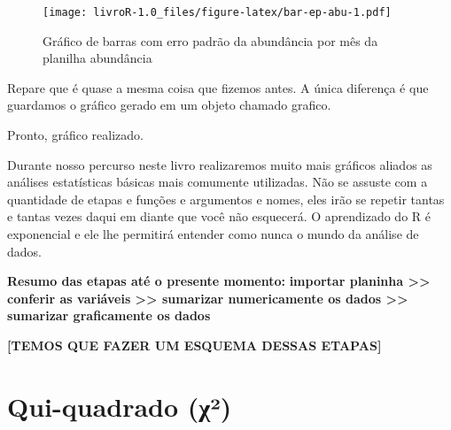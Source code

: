 \documentclass[]{book}
\newenvironment{Shaded}{\begin{snugshade}}{\end{snugshade}}
\newcommand{\DataTypeTok}[1]{\textcolor[rgb]{0.13,0.29,0.53}{#1}}
\newcommand{\DecValTok}[1]{\textcolor[rgb]{0.00,0.00,0.81}{#1}}
\newcommand{\KeywordTok}[1]{\textcolor[rgb]{0.13,0.29,0.53}{\textbf{#1}}}
\newcommand{\NormalTok}[1]{#1}
\newcommand{\OperatorTok}[1]{\textcolor[rgb]{0.81,0.36,0.00}{\textbf{#1}}}
\newcommand{\StringTok}[1]{\textcolor[rgb]{0.31,0.60,0.02}{#1}}
\begin{document}
\begin{Shaded}
\end{Shaded}

\begin{figure}
\centering
\texttt{[image: livroR-1.0\_files/figure-latex/bar-ep-abu-1.pdf]}
\caption{\label{fig:bar-ep-abu}Gráfico de barras com erro padrão da abundância por mês da planilha abundância}
\end{figure}

Repare que é quase a mesma coisa que fizemos antes. A única diferença é que guardamos o gráfico gerado em um objeto chamado grafico.

Pronto, gráfico realizado.

Durante nosso percurso neste livro realizaremos muito mais gráficos aliados as análises estatísticas básicas mais comumente utilizadas. Não se assuste com a quantidade de etapas e funções e argumentos e nomes, eles irão se repetir tantas e tantas vezes daqui em diante que você não esquecerá. O aprendizado do R é exponencial e ele lhe permitirá entender como nunca o mundo da análise de dados.

\textbf{Resumo das etapas até o presente momento:}
\textbf{importar planinha \textgreater{}\textgreater{} conferir as variáveis \textgreater{}\textgreater{} sumarizar numericamente os dados \textgreater{}\textgreater{} sumarizar graficamente os dados}

\textbf{{[}TEMOS QUE FAZER UM ESQUEMA DESSAS ETAPAS{]}}

\hypertarget{qui-quadrado-ux3c7}{%
\chapter{Qui-quadrado (χ²)}\label{qui-quadrado-ux3c7}}
\end{document}
